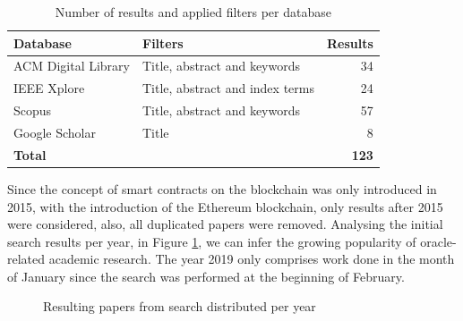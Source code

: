 \begin{table}[H]
  \centering
  \begin{tabular}{llr}
    \hline
    \textbf{Database}   & \textbf{Filters}                & \textbf{Results} \\ \hline
    ACM Digital Library & Title, abstract and keywords    & 34               \\
    IEEE Xplore         & Title, abstract and index terms & 24               \\
    Scopus              & Title, abstract and keywords    & 57               \\
    Google Scholar      & Title                           & 8                \\ \hline
    \textbf{Total}      & \textbf{}                       & \textbf{123}     \\ \hline
  \end{tabular}
  \caption{Number of results and applied filters per database}
  \label{search-results-table}
\end{table}

Since the concept of smart contracts on the blockchain was only introduced in 2015, with the introduction of the Ethereum blockchain, only results after 2015 were considered, also, all duplicated papers were removed. Analysing the initial search results per year, in Figure \ref{search-results-per-year}, we can infer the growing popularity of oracle-related academic research. The year 2019 only comprises work done in the month of January since the search was performed at the beginning of February.

\begin{figure}[H]
  \centering
  \caption{Resulting papers from search distributed per year}
  \label{search-results-per-year}
\end{figure}


